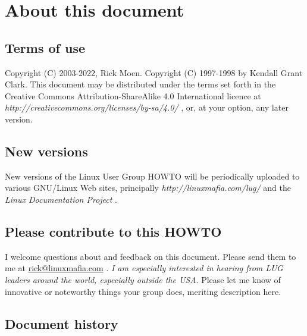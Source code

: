 \section{About this document}

\subsection{Terms of use}

Copyright (C) 2003-2022, Rick Moen.  Copyright (C) 1997-1998 by Kendall Grant 
Clark. This document may be distributed under the terms set forth 
in the Creative Commons Attribution-ShareAlike 4.0 International licence at 
\emph{http://creativecommons.org/licenses/by-sa/4.0/} \texttt{\aeuurl}
, or, at your
option, any later version.

\subsection{New versions}

New versions of the Linux User Group HOWTO will be periodically
uploaded to various GNU/Linux Web sites, principally 
\emph{http://linuxmafia.com/lug/} \texttt{\aevurl}
and the
\emph{Linux Documentation Project} \texttt{\aewurl}.

\subsection{Please contribute to this HOWTO}

I welcome questions about and feedback on this document. Please send
them to me at \ifpdf
\href{mailto:rick@linuxmafia.com}{rick@linuxmafia.com}%
\else
{}%
\fi{}
. {\itshape I am especially interested in
hearing from LUG leaders around the world, especially outside the USA\/}.
Please let me know of innovative or noteworthy things your group does,
meriting description here.

\subsection{Document history}

